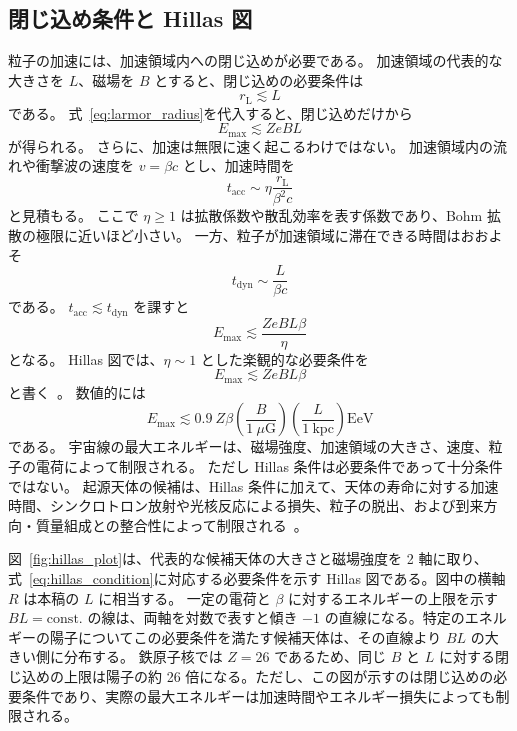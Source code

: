 \documentclass[book,paper=a4,fontsize=11pt]{jlreq}
\begin{document}
\subsection{閉じ込め条件と Hillas 図}\label{subsec:hillas_condition}
粒子の加速には、加速領域内への閉じ込めが必要である。
加速領域の代表的な大きさを \(L\)、磁場を \(B\) とすると、閉じ込めの必要条件は
\begin{equation}
  r_{\mathrm{L}}\lesssim L
\end{equation}
である。
式~\eqref{eq:larmor_radius}を代入すると、閉じ込めだけから
\begin{equation}
  E_{\max}
  \lesssim
  ZeBL
\end{equation}
が得られる。
さらに、加速は無限に速く起こるわけではない。
加速領域内の流れや衝撃波の速度を \(v=\beta c\) とし、加速時間を
\begin{equation}
  t_{\mathrm{acc}}
  \sim
  \eta
  \frac{r_{\mathrm{L}}}{\beta^2 c}
\end{equation}
と見積もる。
ここで \(\eta\geq1\) は拡散係数や散乱効率を表す係数であり、Bohm 拡散の極限に近いほど小さい。
一方、粒子が加速領域に滞在できる時間はおおよそ
\begin{equation}
  t_{\mathrm{dyn}}
  \sim
  \frac{L}{\beta c}
\end{equation}
である。
\(t_{\mathrm{acc}}\lesssim t_{\mathrm{dyn}}\) を課すと
\begin{equation}
  E_{\max}
  \lesssim
  \frac{ZeBL\beta}{\eta}
\end{equation}
となる。
Hillas 図では、\(\eta\sim1\) とした楽観的な必要条件を
\begin{equation}
  E_{\max}\lesssim ZeBL\beta
  \label{eq:hillas_condition}
\end{equation}
と書く~\cite{Hillas1984,KoteraOlinto2011}。
数値的には
\begin{equation}
  E_{\max}
  \lesssim
  0.9\ Z\beta
  \left(\frac{B}{1\ \mu\mathrm{G}}\right)
  \left(\frac{L}{1\ \mathrm{kpc}}\right)
  \mathrm{EeV}
\end{equation}
である。
宇宙線の最大エネルギーは、磁場強度、加速領域の大きさ、速度、粒子の電荷によって制限される。
ただし Hillas 条件は必要条件であって十分条件ではない。
起源天体の候補は、Hillas 条件に加えて、天体の寿命に対する加速時間、シンクロトロン放射や光核反応による損失、粒子の脱出、および到来方向・質量組成との整合性によって制限される~\cite{KoteraOlinto2011,GlobusBlandford2023}。

図~\ref{fig:hillas_plot}は、代表的な候補天体の大きさと磁場強度を 2 軸に取り、式~\eqref{eq:hillas_condition}に対応する必要条件を示す Hillas 図である。図中の横軸 \(R\) は本稿の \(L\) に相当する。
一定の電荷と \(\beta\) に対するエネルギーの上限を示す \(BL=\mathrm{const.}\) の線は、両軸を対数で表すと傾き \(-1\) の直線になる。特定のエネルギーの陽子についてこの必要条件を満たす候補天体は、その直線より \(BL\) の大きい側に分布する。
鉄原子核では \(Z=26\) であるため、同じ \(B\) と \(L\) に対する閉じ込めの上限は陽子の約 26 倍になる。ただし、この図が示すのは閉じ込めの必要条件であり、実際の最大エネルギーは加速時間やエネルギー損失によっても制限される。
\end{document}
